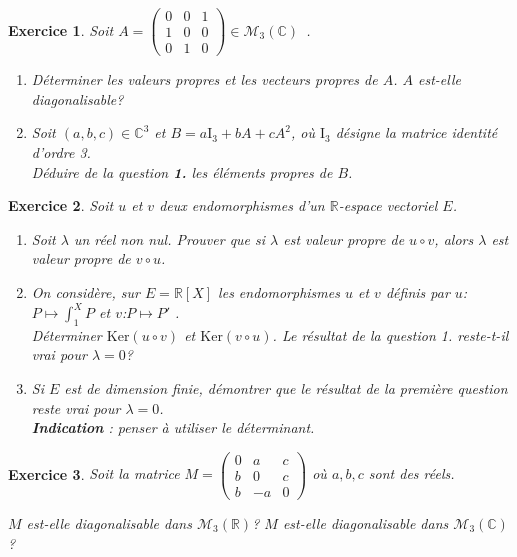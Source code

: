 \documentclass[12pt,a4paper]{article}
\theoremstyle{break}
\theoremstyle{break}
\newtheorem{Exo}{Exercice}
\begin{document}
\begin{Exo}
	Soit $A=\begin{pmatrix}
	0 & 0 & 1 \\ 
	1 & 0 & 0 \\ 
	0 & 1 & 0
\end{pmatrix} \in \mathcal{M}_{3}\left( \mathbb{C}\right)$~.

\begin{enumerate}
	\item D\'{e}terminer les valeurs propres et les vecteurs propres de $A$. $A$ est-elle diagonalisable?
	\item Soit $\left( a,b,c\right) \in \mathbb{C}^{3}$ et $B=a\mathrm{I}_{3}+bA+cA^{2}$, où $\mathrm{I}_3$ désigne la matrice identité d'ordre 3.\\ D\'{e}duire de la question \textbf{1.} les \'{e}l\'{e}ments propres de $B$.
\end{enumerate}
\end{Exo}


\begin{Exo}
	Soit $u$ et $v$ deux endomorphismes d'un $\mathbb{R}$-espace vectoriel $E$.
	
	\begin{enumerate}
		\item Soit $\lambda$ un réel non nul. Prouver que si $\lambda$ est valeur propre de $u\circ v$, alors $\lambda$ est valeur propre de $v\circ u$.\\
		\:\:\:\:
		\item On considère, sur $E=\mathbb{R}\left[ X\right] $ les endomorphismes $u$ et $v$ définis par 
		$u$:\:$P\longmapsto \displaystyle\int_{1}^{X}P $ et $v$:\:$P\longmapsto P'$ .\\
		Déterminer $ \mathrm{Ker} (u\circ v)$ et $\mathrm{Ker} (v\circ u)$.
		Le résultat de la question 1. reste-t-il vrai pour $\lambda=0$?\:\:\:\:
		\item 
		Si $E$ est de dimension finie, démontrer que le résultat de la première question reste vrai pour $\lambda=0$.\\
		\textbf{Indication }: penser à utiliser le déterminant.\:\:\:\:
		
	\end{enumerate}
\end{Exo}

\begin{Exo}
	Soit la matrice $M=\begin{pmatrix}
	0 & a & c \\ 
	b & 0 & c \\ 
	b & -a & 0
\end{pmatrix}$ o\`{u} $a,b,c$ sont des r\'{e}els.


$M$ est-elle diagonalisable dans $\mathcal{M}_{3}\left(\mathbb{R}\right)$?
$M$ est-elle diagonalisable dans $\mathcal{M}_{3}\left( \mathbb{C}\right)$?
\end{Exo}
\end{document}
